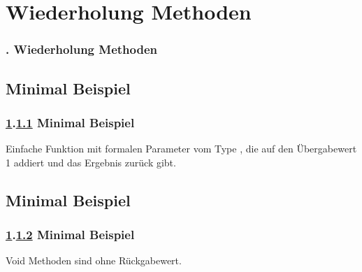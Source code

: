 \def\stitle{Wiederholung Methoden}
\section{\stitle}\label{K:wdh}
\begin{frame}
  \frametitle{\kap. \stitle}%
\tableofcontents[current]
\end{frame}

\def\stitle{Minimal Beispiel}
\subsection{\stitle}\label{S:bsp}
\begin{frame}[t]%
  \frametitle{\ref{K:wdh}.\ref{S:bsp} \stitle}


Einfache Funktion mit formalen Parameter  vom Type , die auf den Übergabewert 1 addiert und das Ergebnis zurück gibt.

\end{frame}

\def\stitle{Minimal Beispiel}
\subsection{\stitle}\label{S:void}
\begin{frame}[t]%
  \frametitle{\ref{K:wdh}.\ref{S:void} \stitle}

Void Methoden sind ohne Rückgabewert.


\end{frame}
